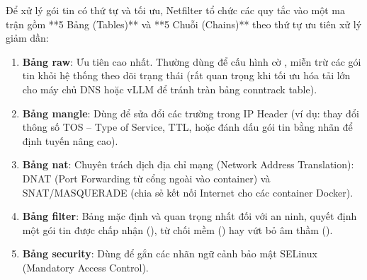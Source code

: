 Để xử lý gói tin có thứ tự và tối ưu, Netfilter tổ chức các quy tắc vào một ma trận gồm **5 Bảng (Tables)** và **5 Chuỗi (Chains)** theo thứ tự ưu tiên xử lý giảm dần:
\begin{enumerate}
  \item \textbf{Bảng raw}: Ưu tiên cao nhất. Thường dùng để cấu hình cờ , miễn trừ các gói tin khỏi hệ thống theo dõi trạng thái  (rất quan trọng khi tối ưu hóa tải lớn cho máy chủ DNS hoặc vLLM để tránh tràn bảng conntrack table).
  \item \textbf{Bảng mangle}: Dùng để sửa đổi các trường trong IP Header (ví dụ: thay đổi thông số TOS -- Type of Service, TTL, hoặc đánh dấu gói tin bằng nhãn  để định tuyến nâng cao).
  \item \textbf{Bảng nat}: Chuyên trách dịch địa chỉ mạng (Network Address Translation): DNAT (Port Forwarding từ cổng ngoài vào container) và SNAT/MASQUERADE (chia sẻ kết nối Internet cho các container Docker).
  \item \textbf{Bảng filter}: Bảng mặc định và quan trọng nhất đối với an ninh, quyết định một gói tin được chấp nhận (), từ chối mềm () hay vứt bỏ âm thầm ().
  \item \textbf{Bảng security}: Dùng để gắn các nhãn ngữ cảnh bảo mật SELinux (Mandatory Access Control).
\end{enumerate}

